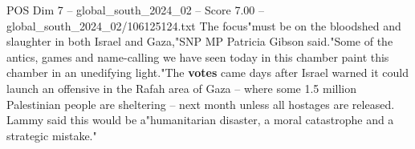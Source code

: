 \begin{textsample}{POS Dim 7 – global\_south\_2024\_02 – Score 7.00 – global\_south\_2024\_02/106125124.txt}
The focus"must be on the bloodshed and slaughter in both Israel and Gaza,"SNP MP Patricia Gibson said."Some of the antics, games and name-calling we have seen today in this chamber paint this chamber in an unedifying light."The \textbf{votes} came days after Israel warned it could launch an offensive in the Rafah area of Gaza -- where some 1.5 million Palestinian people are sheltering -- next month unless all hostages are released.
Lammy said this would be a"humanitarian disaster, a moral catastrophe and a strategic mistake."

\end{textsample}
